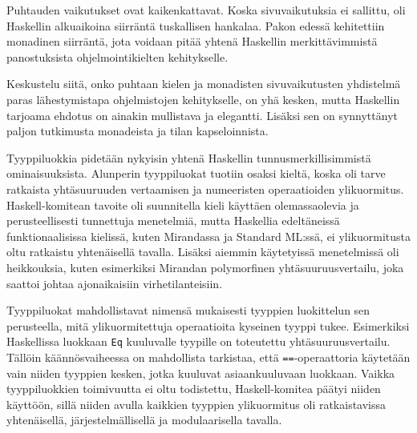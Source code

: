 \documentclass[finnish]{tktltiki2}
\begin{document}
Puhtauden vaikutukset ovat kaikenkattavat. Koska sivuvaikutuksia ei sallittu, oli Haskellin alkuaikoina siirräntä tuskallisen hankalaa. Pakon edessä kehitettiin monadinen siirräntä, jota voidaan pitää yhtenä Haskellin merkittävimmistä panostuksista ohjelmointikielten kehitykselle.

Keskustelu siitä, onko puhtaan kielen ja monadisten sivuvaikutusten yhdistelmä paras lähestymistapa ohjelmistojen kehitykselle, on yhä kesken, mutta Haskellin tarjoama ehdotus on ainakin mullistava ja elegantti. Lisäksi sen on synnyttänyt paljon tutkimusta monadeista ja tilan kapseloinnista.


Tyyppiluokkia pidetään nykyisin yhtenä Haskellin tunnusmerkillisimmistä ominaisuuksista. Alunperin tyyppiluokat tuotiin osaksi kieltä, koska oli tarve ratkaista yhtäsuuruuden vertaamisen ja numeeristen operaatioiden ylikuormitus. Haskell-komitean tavoite oli suunnitella kieli käyttäen olemassaolevia ja perusteellisesti tunnettuja menetelmiä, mutta Haskellia edeltäneissä funktionaalisissa kielissä, kuten Mirandassa ja Standard ML:ssä, ei ylikuormitusta oltu ratkaistu yhtenäisellä tavalla. Lisäksi aiemmin käytetyissä menetelmissä oli heikkouksia, kuten esimerkiksi Mirandan polymorfinen yhtäsuuruusvertailu, joka saattoi johtaa ajonaikaisiin virhetilanteisiin.

Tyyppiluokat mahdollistavat nimensä mukaisesti tyyppien luokittelun sen perusteella, mitä ylikuormitettuja operaatioita kyseinen tyyppi tukee. Esimerkiksi Haskellissa luokkaan \texttt{Eq} kuuluvalle tyypille on toteutettu yhtäsuuruusvertailu. Tällöin käännösvaiheessa on mahdollista tarkistaa, että \texttt{==}-operaattoria käytetään vain niiden tyyppien kesken, jotka kuuluvat asiaankuuluvaan luokkaan. Vaikka tyyppiluokkien toimivuutta ei oltu todistettu, Haskell-komitea päätyi niiden käyttöön, sillä niiden avulla kaikkien tyyppien ylikuormitus oli ratkaistavissa yhtenäisellä, järjestelmällisellä ja modulaarisella tavalla.



\end{document}
